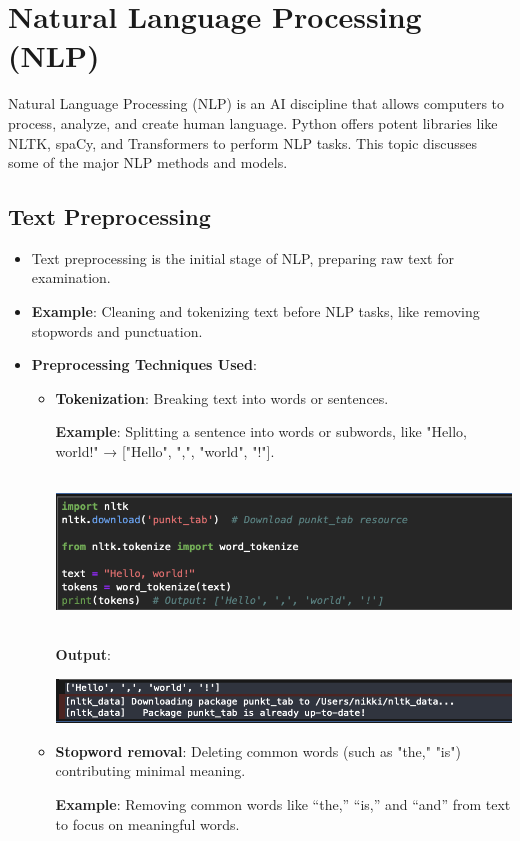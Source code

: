 \documentclass{article}
\begin{document}
\section{Natural Language Processing (NLP)}
Natural Language Processing (NLP) is an AI discipline that allows computers to process, analyze, and create human language. Python offers potent libraries like NLTK, spaCy, and Transformers to perform NLP tasks. This topic discusses some of the major NLP methods and models.
\subsection{Text Preprocessing}
\begin{itemize}
    \item Text preprocessing is the initial stage of NLP, preparing raw text for examination.
    \item \textbf{Example}: Cleaning and tokenizing text before NLP tasks, like removing stopwords and punctuation.
    \item \textbf{Preprocessing Techniques Used}:
    \begin{itemize}
    \item \textbf{Tokenization}: Breaking text into words or sentences.
    
    \textbf{Example}: Splitting a sentence into words or subwords, like "Hello, world!" → ["Hello", ",", "world", "!"].

    \includegraphics[width=14cm,height=4cm]{Tokenization.png}

\textbf{Output}:

\includegraphics[width=14cm,height=2
cm]{Tokenization_Output.png}
    \item \textbf{Stopword removal}: Deleting common words (such as "the," "is") contributing minimal meaning.

    \textbf{Example}: Removing common words like “the,” “is,” and “and” from text to focus on meaningful words.


\end{itemize}
\end{itemize}
\end{document}
